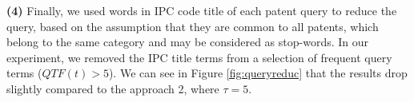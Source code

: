 \vspace*{0.5mm}
\noindent \textbf{(4)} Finally, we used words in IPC code title of each patent query to reduce the query, based on the assumption that they are common to all patents, which belong to the same category and may be considered as stop-words. In our experiment, we removed the IPC title terms from a selection of frequent query terms ($QTF(t)>5$). We can see in Figure \ref{fig:queryreduc} that the results drop slightly compared to the approach 2, where $\tau=5$.
%
%
%


